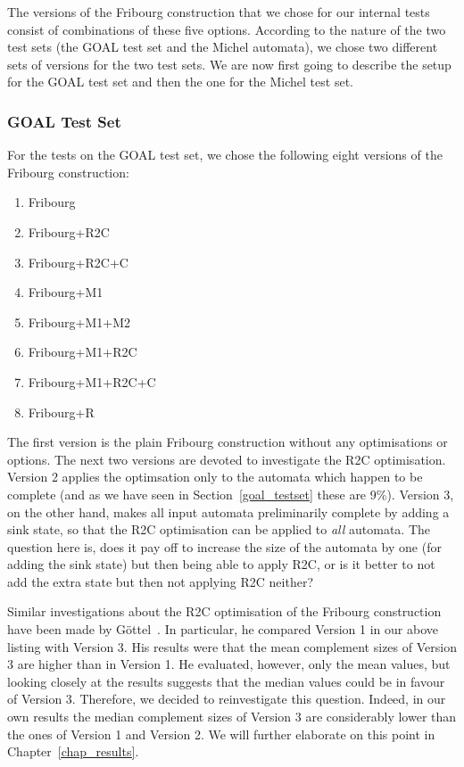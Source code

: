 The versions of the Fribourg construction that we chose for our internal tests consist of combinations of these five options. According to the nature of the two test sets (the GOAL test set and the Michel automata), we chose two different sets of versions for the two test sets. We are now first going to describe the setup for the GOAL test set and then the one for the Michel test set.

\subsubsection{GOAL Test Set}

For the tests on the GOAL test set, we chose the following eight versions of the Fribourg construction:
\begin{enumerate}
\item Fribourg
\item Fribourg+R2C
\item Fribourg+R2C+C
\item Fribourg+M1
\item Fribourg+M1+M2
\item Fribourg+M1+R2C
\item Fribourg+M1+R2C+C
\item Fribourg+R
\end{enumerate}

The first version is the plain Fribourg construction without any optimisations or options. The next two versions are devoted to investigate the R2C optimisation. Version 2 applies the optimsation only to the automata which happen to be complete (and as we have seen in Section~\ref{goal_testset} these are 9\%). Version 3, on the other hand, makes all input automata preliminarily complete by adding a sink state, so that the R2C optimisation can be applied to \textit{all} automata. The question here is, does it pay off to increase the size of the automata by one (for adding the sink state) but then being able to apply R2C, or is it better to not add the extra state but then not applying R2C neither?

Similar investigations about the R2C optimisation of the Fribourg construction have been made by Göttel~\cite{2013_bsc_goettel}. In particular, he compared Version 1 in our above listing with Version 3. His results were that the mean complement sizes of Version 3 are higher than in Version 1. He evaluated, however, only the mean values, but looking closely at the results suggests that the median values could be in favour of Version 3. Therefore, we decided to reinvestigate this question. Indeed, in our own results the median complement sizes of Version 3 are considerably lower than the ones of Version 1 and Version 2. We will further elaborate on this point in Chapter~\ref{chap_results}.

